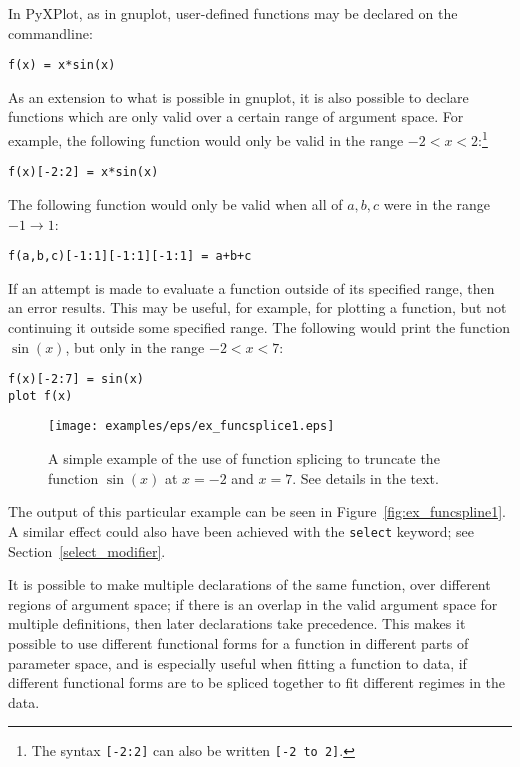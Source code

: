 \documentclass[a4paper,onecolumn,11pt]{book}
\begin{document}
In PyXPlot, as in gnuplot, user-defined functions may be declared on the
commandline:

\begin{verbatim}
f(x) = x*sin(x)
\end{verbatim}

\noindent As an extension to what is possible in gnuplot, it is also possible
to declare functions which are only valid over a certain range of argument
space. For example, the following function would only be valid in the range
$-2<x<2$:\footnote{The syntax \texttt{[-2:2]} can also be written \texttt{[-2
to 2]}.}

\begin{verbatim}
f(x)[-2:2] = x*sin(x)
\end{verbatim}

\noindent The following function would only be valid when all of ${a,b,c}$ were
in the range $-1 \to 1$:

\begin{verbatim}
f(a,b,c)[-1:1][-1:1][-1:1] = a+b+c
\end{verbatim}

If an attempt is made to evaluate a function outside of its specified range,
then an error results. This may be useful, for example, for plotting a
function, but not continuing it outside some specified range. The following
would print the function $\sin(x)$, but only in the range $-2<x<7$:

\begin{verbatim}
f(x)[-2:7] = sin(x)
plot f(x)
\end{verbatim}

\begin{figure}
\begin{center}
\texttt{[image: examples/eps/ex\_funcsplice1.eps]}
\end{center}
\caption{A simple example of the use of function splicing to truncate the function $\sin(x)$ at $x=-2$ and $x=7$. See details in the text.}
\label{fig:ex_funcsplice1}
\end{figure}

\label{splice} \noindent The output of this particular example can be seen in
Figure~\ref{fig:ex_funcspline1}. A similar effect could also have been achieved
with the \texttt{select} keyword; see Section~\ref{select_modifier}.

It is possible to make multiple declarations of the same function, over
different regions of argument space; if there is an overlap in the valid
argument space for multiple definitions, then later declarations take
precedence. This makes it possible to use different functional forms for a
function in different parts of parameter space, and is especially useful when
fitting a function to data, if different functional forms are to be spliced
together to fit different regimes in the data.
\end{document}
